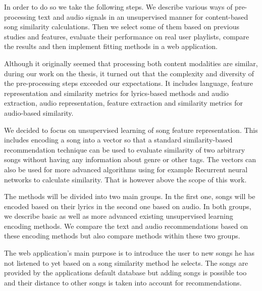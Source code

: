 In order to do so we take the following steps. We describe various ways of pre-processing text and audio signals in an unsupervised manner for content-based song similarity calculations. Then we select some of them based on previous studies and features, evaluate their performance on real user playlists, compare the results and then implement fitting methods in a web application.

Although it originally seemed that processing both content modalities are similar, during our work on the thesis, it turned out that the complexity and diversity of the pre-processing steps exceeded our expectations. It includes language, feature representation and similarity metrics for lyrics-based methods and audio extraction, audio representation, feature extraction and similarity metrics for audio-based similarity. 

We decided to focus on unsupervised learning of song feature representation. This includes encoding a song into a vector so that a standard similarity-based recommendation technique can be used to evaluate similarity of two arbitrary songs without having any information about genre or other tags. The vectors can also be used for more advanced algorithms using for example Recurrent neural networks to calculate similarity. That is however above the scope of this work. 

The methods will be divided into two main groups. In the first one, songs will be encoded based on their lyrics in the second one based on audio. In both groups, we describe basic as well as more advanced existing unsupervised learning encoding methods. We compare the text and audio recommendations based on these encoding methods but also compare methods within these two groups. 

The web application's main purpose is to introduce the user to new songs he has not listened to yet based on a song similarity method he selects. The songs are provided by the applications default database but adding songs is possible too and their distance to other songs is taken into account for recommendations. 
